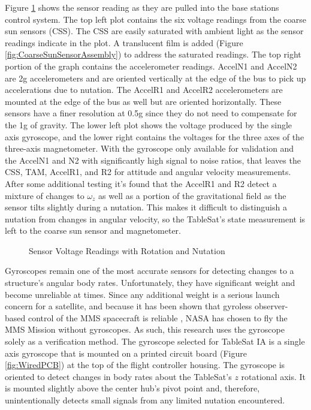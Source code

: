 Figure \ref{fig:SensorVoltageReadings} shows the sensor reading as they are pulled into the base stations control system.  The top left plot contains the six voltage readings from the coarse sun sensors (CSS).  The CSS are easily saturated with ambient light as the sensor readings indicate in the plot.  A translucent film is added (Figure \ref{fig:CoarseSunSensorAssembly}) to address the saturated readings.  The top right portion of the graph contains the accelerometer readings.  AccelN1 and AccelN2 are 2g accelerometers and are oriented vertically at the edge of the bus to pick up accelerations due to nutation.  The AccelR1 and AccelR2 accelerometers are mounted at the edge of the bus as well but are oriented horizontally.  These sensors have a finer resolution at 0.5g since they do not need to compensate for the 1g of gravity.  The lower left plot shows the voltage produced by the single axis gyroscope, and the lower right contains the voltages for the three axes of the three-axis magnetometer.  With the gyroscope only available for validation and the AccelN1 and N2 with significantly high signal to noise ratios, that leaves the CSS, TAM, AccelR1, and R2 for attitude and angular velocity measurements.  After some additional testing it's found that the AccelR1 and R2 detect a mixture of changes to $\omega_z$ as well as a portion of the gravitational field as the sensor tilts slightly during a nutation.  This makes it difficult to distinguish a nutation from changes in angular velocity, so the TableSat's state measurement is left to the coarse sun sensor and magnetometer.

\begin{figure}[H]
  \centerline{}
  \caption{Sensor Voltage Readings with Rotation and Nutation}
  \label{fig:SensorVoltageReadings}
\end{figure}

Gyroscopes remain one of the most accurate sensors for detecting changes to a structure's angular body rates.  Unfortunately, they have significant weight and become unreliable at times.  Since any additional weight is a serious launch concern for a satellite, and because it has been shown that gyroless observer-based control of the MMS spacecraft is reliable \cite{mushawehthesis}, NASA has chosen to fly the MMS Mission without gyroscopes.  As such, this research uses the gyroscope solely as a verification method.  The gyroscope selected for TableSat IA is a single axis gyroscope that is mounted on a printed circuit board (Figure \ref{fig:WiredPCB}) at the top of the flight controller housing.  The gyroscope is oriented to detect changes in body rates about the TableSat's $z$ rotational axis.  It is mounted slightly above the center hub's pivot point and, therefore, unintentionally detects small signals from any limited nutation encountered.

